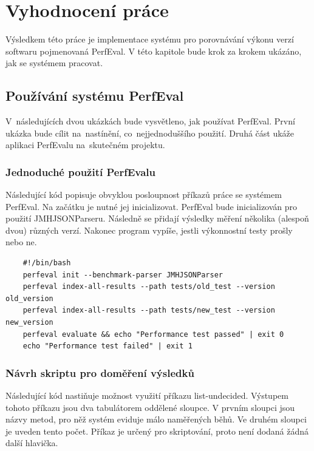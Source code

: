 \chapter{Vyhodnocení práce}

Výsledkem této práce je implementace systému pro porovnávání výkonu verzí softwaru
pojmenovaná PerfEval. V této kapitole bude krok za krokem ukázáno, jak se systémem pracovat.

\section{Používání systému PerfEval}

V~následujících dvou ukázkách bude vysvětleno, jak používat PerfEval. První ukázka bude
cílit na~nastínění, co~nejjednoduššího použití. Druhá část ukáže aplikaci PerfEvalu na~skutečném projektu.

\subsection{Jednoduché použití PerfEvalu}

Následující kód popisuje obvyklou posloupnost příkazů práce se systémem PerfEval.
Na začátku je nutné jej inicializovat. PerfEval bude inicializován pro použití JMHJSONParseru.
Následně se přidají výsledky měření několika (alespoň dvou) různých verzí.
Nakonec program vypíše, jestli výkonnostní testy prošly nebo ne.

\begin{lstlisting}
    #!/bin/bash
    perfeval init --benchmark-parser JMHJSONParser
    perfeval index-all-results --path tests/old_test --version old_version
    perfeval index-all-results --path tests/new_test --version new_version
    perfeval evaluate && echo "Performance test passed" | exit 0
    echo "Performance test failed" | exit 1
\end{lstlisting}

\bigskip

\subsection{Návrh skriptu pro doměření výsledků}

Následující kód nastiňuje možnost využití příkazu list-undecided. Výstupem tohoto příkazu
jsou dva tabulátorem oddělené sloupce. V prvním sloupci jsou názvy metod, pro něž systém
eviduje málo naměřených běhů. Ve druhém sloupci je uveden tento počet. Příkaz je určený
pro skriptování, proto není dodaná žádná další hlavička.

